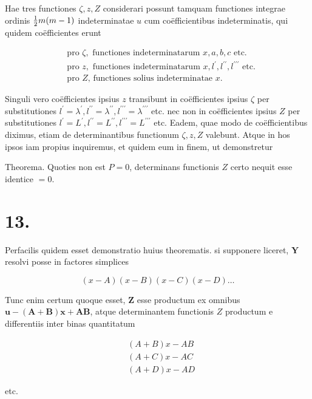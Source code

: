 \documentclass[twoside,12pt, showframe]{memoir}
\let\oldfrac\frac
\def\frac#1#2{\mathchoice{\tfrac{#1}{#2}}{\oldfrac{#1}{#2}}{\genfrac{}{}{}{2}{#1}{#2\mathstrut}}{\genfrac{}{}{}{3}{#1}{#2\mathstrut}}}
\begin{document}
Hae tres functiones \(\zeta, z, Z\) considerari possunt tamquam functiones integrae ordinis \(\frac{1}{2} m(m-1)\) indeterminatae \(u\) cum coëfficientibus indeterminatis, qui
quidem coëfficientes erunt

\[
\begin{aligned}
& \text { pro } \zeta, \text { functiones indeterminatarum } x, a, b, c \text { etc. } \\
& \text { pro } z, \text { functiones indeterminatarum } x, l^{\prime}, l^{\prime \prime}, l^{\prime \prime \prime} \text { etc. } \\
& \text { pro } Z \text {, functiones solius indeterminatae } x .
\end{aligned}
\]

Singuli vero coëfficientes ipsius \(z\) transibunt in coëfficientes ipsius \(\zeta\) per substitutiones \(l^{\prime}=\lambda^{\prime}, l^{\prime \prime}=\lambda^{\prime \prime}, l^{\prime \prime \prime}=\lambda^{\prime \prime \prime}\) etc. nec non in coëfficientes ipsius \(Z\) per substitutiones \(l^{\prime}=L^{\prime}, l^{\prime \prime}=L^{\prime \prime}, l^{\prime \prime \prime}=L^{\prime \prime \prime}\) etc. Eadem, quae modo de coëfficientibus diximus, etiam de determinantibus functionum \(\zeta, z, Z\) valebunt. Atque in hos ipsos iam propius inquiremus, et quidem eum in finem, ut demonstretur

Theorema. Quoties non est \(P=0\), determinans functionis \(Z\) certo nequit esse identice \(=0\).

\section*{13.}
Perfacilis quidem esset demonstratio huius theorematis. si supponere liceret, \(\boldsymbol{Y}\) resolvi posse in factores simplices

\[
(x-A)(x-B)(x-C)(x-D) \ldots
\]

Tunc enim certum quoque esset, \(\boldsymbol{Z}\) esse productum ex omnibus \(\boldsymbol{u}-(\boldsymbol{A}+\boldsymbol{B}) \boldsymbol{x}+\boldsymbol{A} \boldsymbol{B}\), atque determinantem functionis \(Z\) productum e differentiis inter binas quantitatum

\[
\begin{aligned}
& (A+B) x-A B \\
& (A+C) x-A C \\
& (A+D) x-A D
\end{aligned}
\]

etc.
\end{document}
